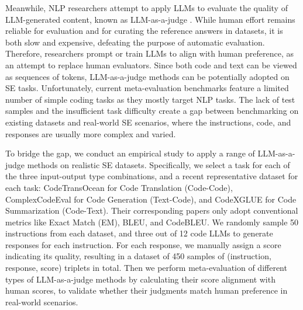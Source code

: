 Meanwhile, NLP researchers attempt to apply LLMs to evaluate the quality of LLM-generated content, known as LLM-as-a-judge \cite{DBLP:conf/nips/ZhengC00WZL0LXZ23}. While human effort remains reliable for evaluation and for curating the reference answers in datasets, it is both slow and expensive, defeating the purpose of automatic evaluation. Therefore, researchers prompt or train LLMs to align with human preference, as an attempt to replace human evaluators. 
Since both code and text can be viewed as sequences of tokens, LLM-as-a-judge methods can be potentially adopted on SE tasks. Unfortunately, current meta-evaluation benchmarks feature a limited number of simple coding tasks as they mostly target NLP tasks. The lack of test samples and the insufficient task difficulty create a gap between benchmarking on existing datasets and real-world SE scenarios, where the instructions, code, and responses are usually more complex and varied.

To bridge the gap, we conduct an empirical study to apply a range of LLM-as-a-judge methods on realistic SE datasets. Specifically, we select a task for each of the three input-output type combinations, and a recent representative dataset for each task: CodeTransOcean \cite{DBLP:conf/emnlp/YanTLCW23} for Code Translation (Code-Code), ComplexCodeEval \cite{DBLP:journals/corr/abs-2409-10280} for Code Generation (Text-Code), and CodeXGLUE \cite{DBLP:conf/nips/LuGRHSBCDJTLZSZ21} for Code Summarization (Code-Text). Their corresponding papers only adopt conventional metrics like Exact Match (EM), BLEU, and CodeBLEU. We randomly sample 50 instructions from each dataset, and three out of 12 code LLMs to generate responses for each instruction. For each response, we manually assign a score indicating its quality, resulting in a dataset of 450 samples of (instruction, response, score) triplets in total. Then we perform meta-evaluation of different types of LLM-as-a-judge methods by calculating their score alignment with human scores, to validate whether their judgments match human preference in real-world scenarios.

